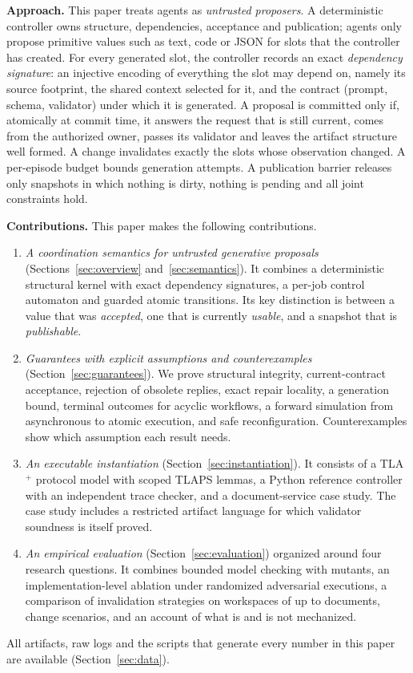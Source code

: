 \documentclass[10pt,journal,compsoc]{IEEEtran}
\theoremstyle{plain}
\theoremstyle{definition}
\begin{document}
\textbf{Approach.} This paper treats agents as \emph{untrusted proposers}. A deterministic controller owns structure, dependencies, acceptance and publication; agents only propose primitive values such as text, code or JSON for slots that the controller has created. For every generated slot, the controller records an exact \emph{dependency signature}: an injective encoding of everything the slot may depend on, namely its source footprint, the shared context selected for it, and the contract (prompt, schema, validator) under which it is generated. A proposal is committed only if, atomically at commit time, it answers the request that is still current, comes from the authorized owner, passes its validator and leaves the artifact structure well formed. A change invalidates exactly the slots whose observation changed. A per-episode budget bounds generation attempts. A publication barrier releases only snapshots in which nothing is dirty, nothing is pending and all joint constraints hold.

\textbf{Contributions.} This paper makes the following contributions.
\begin{enumerate}
\item \emph{A coordination semantics for untrusted generative proposals} (Sections~\ref{sec:overview} and~\ref{sec:semantics}). It combines a deterministic structural kernel with exact dependency signatures, a per-job control automaton and guarded atomic transitions. Its key distinction is between a value that was \emph{accepted}, one that is currently \emph{usable}, and a snapshot that is \emph{publishable}.
\item \emph{Guarantees with explicit assumptions and counterexamples} (Section~\ref{sec:guarantees}). We prove structural integrity, current-contract acceptance, rejection of obsolete replies, exact repair locality, a generation bound, terminal outcomes for acyclic workflows, a forward simulation from asynchronous to atomic execution, and safe reconfiguration. Counterexamples show which assumption each result needs.
\item \emph{An executable instantiation} (Section~\ref{sec:instantiation}). It consists of a TLA$^+$ protocol model with scoped TLAPS lemmas, a Python reference controller with an independent trace checker, and a document-service case study. The case study includes a restricted artifact language for which validator soundness is itself proved.
\item \emph{An empirical evaluation} (Section~\ref{sec:evaluation}) organized around four research questions. It combines bounded model checking with mutants, an implementation-level ablation under \AblTotalRuns{} randomized adversarial executions, a comparison of invalidation strategies on workspaces of up to \CostMaxN{} documents, \Scenarios{} change scenarios, and an account of what is and is not mechanized.
\end{enumerate}
All artifacts, raw logs and the scripts that generate every number in this paper are available (Section~\ref{sec:data}).
\end{document}
